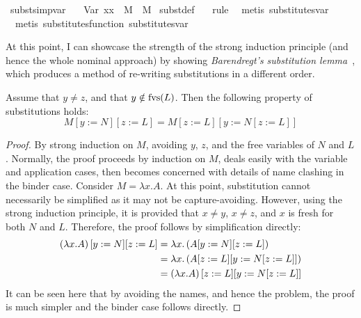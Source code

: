 \begin{implementation}
\isamarkupfalse%
\ subst{\isacharunderscore}simp{\isacharunderscore}var{}{\isacharcolon}\isanewline
\ \ \ {\isachardoublequoteopen}{\isacharparenleft}Var\ x{\isacharparenright}{\isacharbrackleft}x\ {\isacharcolon}{\isacharcolon}{\isacharequal}\ M{\isacharbrackright}\ {\isacharequal}\ M{\isachardoublequoteclose}\isanewline
\isatagproof
{}\isamarkupfalse%
\ subst{\isacharunderscore}def\ \isamarkupfalse%
{\isacharparenleft}\isanewline
\ \ rule{\isacharcomma}\isanewline
\ \ metis\ substitutes{\isachardot}var{}{\isacharcomma}\isanewline
\ \ metis\ substitutes{\isacharunderscore}function\ substitutes{\isachardot}var{}\isanewline
{\isacharparenright}%
\end{implementation}

At this point, I can showcase the strength of the strong induction principle (and hence the whole nominal approach) by showing \emph{Barendregt's substitution lemma}~\cite{lambda-overview}, which produces a method of re-writing substitutions in a different order.

\begin{lemma}
Assume that \(y \neq z\), and that \(y \notin \mathrm{fvs}(L)\).
Then the following property of substitutions holds:
\[
M[y := N][z := L] = M[z := L][y := N[z := L]]
\]
\end{lemma}
\begin{proof}
By strong induction on \(M\), avoiding \(y\), \(z\), and the free variables of \(N\) and \(L\).
Normally, the proof proceeds by induction on \(M\), deals easily with the variable and application cases, then becomes concerned with details of name clashing in the binder case.
Consider \(M = \lambda x. A\).
At this point, substitution cannot necessarily be simplified as it may not be capture-avoiding.
However, using the strong induction principle, it is provided that \(x \neq y\), \(x \neq z\), and \(x\) is fresh for both \(N\) and \(L\).
Therefore, the proof follows by simplification directly:
\begin{align*}
\left(\lambda x. A\right)[y := N][z := L]
&= \lambda x. \left(A[y := N][z := L]\right)\\
&= \lambda x. \left(A[z := L][y := N[z := L]]\right)\\
&= \left(\lambda x. A\right)[z := L][y := N[z := L]]
\end{align*}
It can be seen here that by avoiding the names, and hence the problem, the proof is much simpler and the binder case follows directly.
\end{proof}

